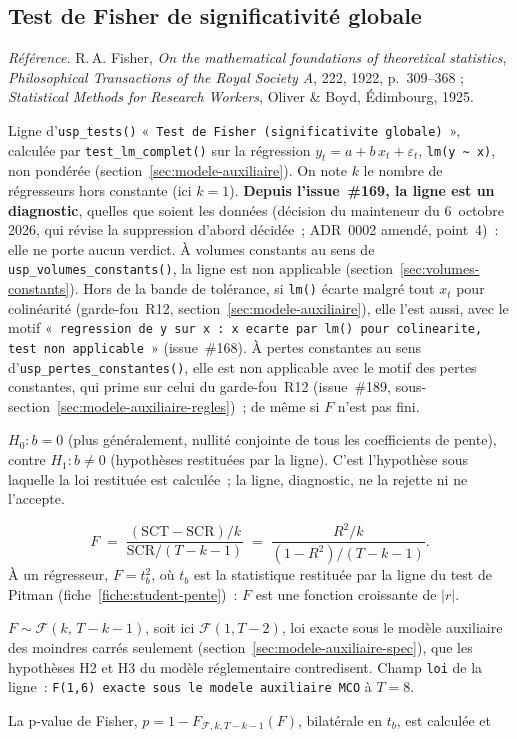 \documentclass[a4paper,11pt]{article}
\newcommand{\code}[1]{\texttt{\small #1}}
\newcommand{\refl}[1]{{\small\textcolor{maincolor!70!black}{\textit{Référence.} #1}}\par\smallskip}
\newcounter{ficheid}
\newenvironment{fiche}[1]{%
  \stepcounter{ficheid}%
  \phantomsection
  \subsection{#1}%
  \label{fiche:\theficheid}%
}{%
  \end{description}\vspace{0.5em}%
}
\newcommand{\Cadre}{%
  \begin{description}[leftmargin=0pt, style=unboxed, itemsep=3pt, topsep=3pt, parsep=2pt]%
  \item[\textcolor{financeblue}{\textbf{1. Cadre, notations et hypothèses de validité (non testées).}}]}
\newcommand{\Hzero}{\item[\textcolor{financeblue}{\textbf{2. Hypothèse nulle.}}]}
\newcommand{\Stat}{\item[\textcolor{financeblue}{\textbf{3. Statistique de test.}}]}
\newcommand{\Loi}{\item[\textcolor{financeblue}{\textbf{4. Loi sous $H_0$.}}]}
\newcommand{\Pval}{\item[\textcolor{financeblue}{\textbf{5. p-value.}}]}
\begin{document}
\begin{fiche}{Test de Fisher de significativité globale}
\label{fiche:fisher-global}%
\refl{R.\,A. Fisher, \emph{On the mathematical foundations of theoretical statistics},
\emph{Philosophical Transactions of the Royal Society A}, 222, 1922, p.~309--368 ;
\emph{Statistical Methods for Research Workers}, Oliver \& Boyd, Édimbourg, 1925.}
\Cadre
Ligne d'\code{usp\_tests()} «~\code{Test de Fisher (significativite globale)}~», calculée par
\code{test\_lm\_complet()} sur la régression $y_t = a + b\,x_t + \varepsilon_t$,
\code{lm(y \textasciitilde\ x)}, non pondérée (section~\ref{sec:modele-auxiliaire}). On note $k$
le nombre de régresseurs hors constante (ici $k=1$). \textbf{Depuis l'issue~\#169, la ligne est un
diagnostic}, quelles que soient les données (décision du mainteneur du 6~octobre 2026, qui
révise la suppression d'abord décidée~; ADR~0002 amendé, point~4)~: elle ne porte aucun verdict.
À volumes constants au sens de \code{usp\_volumes\_constants()}, la ligne est non applicable
(section~\ref{sec:volumes-constants}). Hors de la bande de tolérance, si \code{lm()} écarte malgré tout $x_t$ pour colinéarité
(garde-fou~R12, section~\ref{sec:modele-auxiliaire}), elle l'est aussi, avec le motif
«~\code{regression de y sur x : x ecarte par lm() pour colinearite, test non applicable}~»
(issue~\#168). À pertes constantes au sens d'\code{usp\_pertes\_constantes()}, elle est non applicable avec le
motif des pertes constantes, qui prime sur celui du garde-fou~R12 (issue~\#189,
sous-section~\ref{sec:modele-auxiliaire-regles})~; de même si $F$ n'est pas fini.
\Hzero
$H_0 : b = 0$ (plus généralement, nullité conjointe de tous les coefficients de pente), contre
$H_1 : b \neq 0$ (hypothèses restituées par la ligne). C'est l'hypothèse sous laquelle la
loi restituée est calculée~; la ligne, diagnostic, ne la rejette ni ne l'accepte.
\Stat
\[
  F \;=\; \frac{(\mathrm{SCT} - \mathrm{SCR})/k}{\mathrm{SCR}/(T-k-1)}
    \;=\; \frac{R^2/k}{(1-R^2)/(T-k-1)} .
\]
À un régresseur, $F = t_b^2$, où $t_b$ est la statistique restituée par la ligne du test de
Pitman (fiche~\ref{fiche:student-pente})~: $F$ est une fonction croissante de $|r|$.
\Loi
$F \sim \mathcal{F}(k,\,T-k-1)$, soit ici $\mathcal{F}(1, T-2)$, loi exacte sous le modèle
auxiliaire des moindres carrés seulement (section~\ref{sec:modele-auxiliaire-spec}), que les
hypothèses H2 et H3 du modèle réglementaire contredisent. Champ \code{loi} de la ligne~:
\texttt{\small F(1,6) exacte sous le modele auxiliaire MCO} à $T = 8$.
\Pval
La p-value de Fisher, $p = 1 - F_{\mathcal{F},k,T-k-1}(F)$, bilatérale en $t_b$, est calculée et

\end{fiche}
\end{document}
